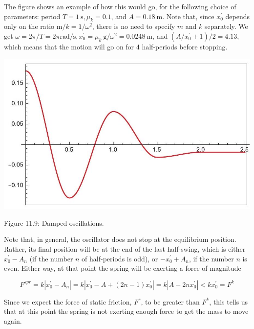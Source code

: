 \documentclass[10pt]{article}
\begin{document}
The figure shows an example of how this would go, for the following choice of parameters: period $T=1 \mathrm{~s}, \mu_{k}=0.1$, and $A=0.18 \mathrm{~m}$. Note that, since $x_{0}^{\prime}$ depends only on the ratio $\mathrm{m} / k=1 / \omega^{2}$, there is no need to specify $m$ and $k$ separately. We get $\omega=2 \pi / T=2 \pi \mathrm{rad} / \mathrm{s}, x_{0}^{\prime}=\mu_{k} \mathrm{~g} / \omega^{2}=0.0248 \mathrm{~m}$, and $\left(A / x_{0}^{\prime}+1\right) / 2=4.13$, which means that the motion will go on for 4 half-periods before stopping.

\begin{center}
\includegraphics[max width=\textwidth]{2024_09_14_9969b06773f10b6936e8g-291}
\end{center}

Figure 11.9: Damped oscillations.

Note that, in general, the oscillator does not stop at the equilibrium position. Rather, its final position will be at the end of the last half-swing, which is either $x_{0}^{\prime}-A_{n}$ (if the number $n$ of half-periods is odd), or $-x_{0}^{\prime}+A_{n}$, if the number $n$ is even. Either way, at that point the spring will be exerting a force of magnitude


\begin{equation*}
F^{s p r}=k\left|x_{0}^{\prime}-A_{n}\right|=k\left|x_{0}^{\prime}-A+(2 n-1) x_{0}^{\prime}\right|=k\left|A-2 n x_{0}^{\prime}\right|<k x_{0}^{\prime}=F^{k} \tag{11.34}
\end{equation*}


Since we expect the force of static friction, $F^{s}$, to be greater than $F^{k}$, this tells us that at this point the spring is not exerting enough force to get the mass to move again.
\end{document}
